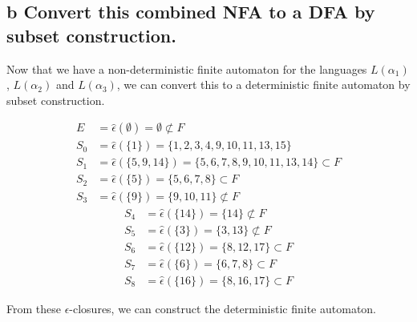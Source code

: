 \documentclass[11pt,a4paper]{article}
\begin{document}
\subsection*{b \mdseries Convert this combined NFA to a DFA by subset
construction.}
Now that we have a non-deterministic finite automaton for the languages
$L(\alpha_1)$, $L(\alpha_2)$ and $L(\alpha_3)$, we can convert this to a
deterministic finite automaton by subset construction.
\vspace{-0.25in}
\begin{multicols}{2}
	\begin{align*}
		E &= \hat{\epsilon}(\emptyset) = \emptyset \not\subset F \\
		S_0 &= \hat{\epsilon}(\{1\}) = \{1,2,3,4,9,10,11,13,15\} \\
		S_1 &= \hat{\epsilon}(\{5,9,14\}) = \{5,6,7,8,9,10,11,13,14\} \subset F \\
		S_2 &= \hat{\epsilon}(\{5\}) = \{5,6,7,8\} \subset F \\
		S_3 &= \hat{\epsilon}(\{9\}) = \{9,10,11\} \not\subset F
	\end{align*}
	\vfill
	\columnbreak
	\begin{align*}
		S_4 &= \hat{\epsilon}(\{14\}) = \{14\} \not\subset F \\
		S_5 &= \hat{\epsilon}(\{3\}) = \{3,13\} \not\subset F \\
		S_6 &= \hat{\epsilon}(\{12\}) = \{8,12,17\} \subset F \\
		S_7 &= \hat{\epsilon}(\{6\}) = \{6,7,8\} \subset F \\
		S_8 &= \hat{\epsilon}(\{16\}) = \{8,16,17\} \subset F
	\end{align*}
	\vfill
\end{multicols}
From these $\epsilon$-closures, we can construct the deterministic finite
automaton.
\end{document}
